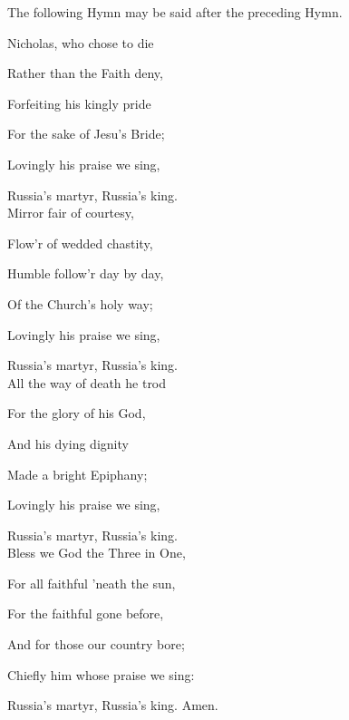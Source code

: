 \begin{rubric}
	The following Hymn may be said after the preceding Hymn.
\end{rubric}
\begin{multicols}{2}
Nicholas, who chose to die

Rather than the Faith deny,

Forfeiting his kingly pride

For the sake of Jesu's Bride;

Lovingly his praise we sing,

Russia's martyr, Russia's king.\\

Mirror fair of courtesy,

Flow'r of wedded chastity,

Humble follow'r day by day,

Of the Church's holy way;

Lovingly his praise we sing,

Russia's martyr, Russia's king.\\

All the way of death he trod

For the glory of his God,

And his dying dignity

Made a bright Epiphany;

Lovingly his praise we sing,

Russia's martyr, Russia's king.\\

Bless we God the Three in One,

For all faithful 'neath the sun,

For the faithful gone before,

And for those our country bore;

Chiefly him whose praise we sing:

Russia's martyr, Russia's king. Amen.\\
\end{multicols}

